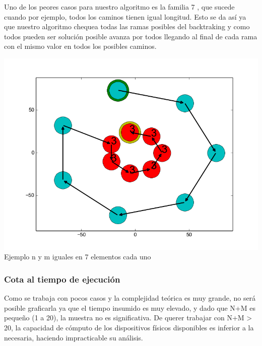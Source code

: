 Uno de los peores casos para nuestro algoritmo es la familia 7 , que sucede cuando por ejemplo, todos los caminos tienen igual longitud. Esto se da as\'i ya que nuestro algoritmo chequea todas las ramas posibles del backtraking y como todos pueden ser soluci\'on posible avanza por todos llegando al final de cada rama con el mismo valor en todos los posibles caminos.\\

\vspace*{0.3cm} \vspace*{0.3cm}
  \begin{center}
 \includegraphics[scale=0.6]{./EJ1/anilloexacto.png}
 {\\Ejemplo n y m iguales en 7 elementos cada uno}
  \end{center}
  \vspace*{0.3cm}


 \subsubsection*{Cota al tiempo de ejecución}


Como se trabaja con pocos casos y la complejidad te\'orica es muy grande, no ser\'a posible graficarla ya que el tiempo insumido es muy elevado, y dado que N+M es pequeño (1 a 20), la muestra no es significativa. De querer trabajar con N+M > 20, la capacidad de cómputo de los dispositivos físicos disponibles es inferior a la necesaria, haciendo impracticable su análisis.




